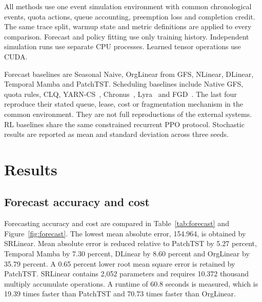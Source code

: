 \documentclass[conference]{IEEEtran}
\begin{document}
All methods use one event simulation environment with common chronological events, quota actions, queue accounting, preemption loss and completion credit. The same trace split, warmup state and metric definitions are applied to every comparison. Forecast and policy fitting use only training history. Independent simulation runs use separate CPU processes. Learned tensor operations use CUDA.

Forecast baselines are Seasonal Naive, OrgLinear from GFS, NLinear, DLinear, Temporal Mamba and PatchTST. Scheduling baselines include Native GFS, quota rules, CLQ, YARN-CS~\cite{yarn}, Chronus~\cite{chronus}, Lyra~\cite{lyra} and FGD~\cite{fgd}. The last four reproduce their stated queue, lease, cost or fragmentation mechanism in the common environment. They are not full reproductions of the external systems. RL baselines share the same constrained recurrent PPO protocol. Stochastic results are reported as mean and standard deviation across three seeds.

\section{Results}
\subsection{Forecast accuracy and cost}
Forecasting accuracy and cost are compared in Table~\ref{tab:forecast} and Figure~\ref{fig:forecast}. The lowest mean absolute error, 154.964, is obtained by SRLinear. Mean absolute error is reduced relative to PatchTST by 5.27 percent, Temporal Mamba by 7.30 percent, DLinear by 8.60 percent and OrgLinear by 35.79 percent. A 0.65 percent lower root mean square error is retained by PatchTST. SRLinear contains 2,052 parameters and requires 10.372 thousand multiply accumulate operations. A runtime of 60.8 seconds is measured, which is 19.39 times faster than PatchTST and 70.73 times faster than OrgLinear.
\end{document}
